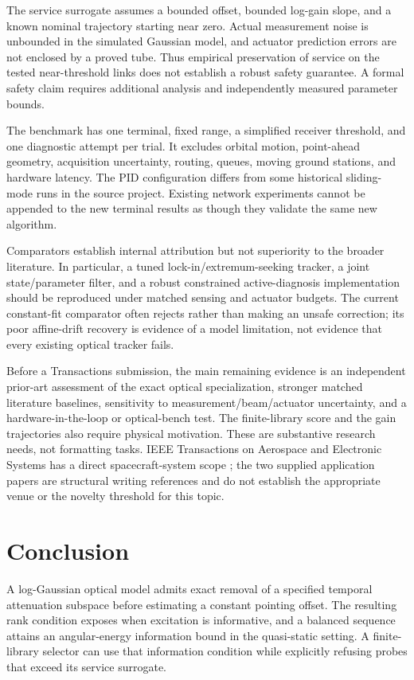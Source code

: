 \documentclass[journal]{IEEEtran}
\begin{document}
The service surrogate assumes a bounded offset, bounded log-gain slope, and a known nominal trajectory starting near zero. Actual measurement noise is unbounded in the simulated Gaussian model, and actuator prediction errors are not enclosed by a proved tube. Thus empirical preservation of service on the tested near-threshold links does not establish a robust safety guarantee. A formal safety claim requires additional analysis and independently measured parameter bounds.

The benchmark has one terminal, fixed range, a simplified receiver threshold, and one diagnostic attempt per trial. It excludes orbital motion, point-ahead geometry, acquisition uncertainty, routing, queues, moving ground stations, and hardware latency. The PID configuration differs from some historical sliding-mode runs in the source project. Existing network experiments cannot be appended to the new terminal results as though they validate the same new algorithm.

Comparators establish internal attribution but not superiority to the broader literature. In particular, a tuned lock-in/extremum-seeking tracker, a joint state/parameter filter, and a robust constrained active-diagnosis implementation should be reproduced under matched sensing and actuator budgets. The current constant-fit comparator often rejects rather than making an unsafe correction; its poor affine-drift recovery is evidence of a model limitation, not evidence that every existing optical tracker fails.

Before a Transactions submission, the main remaining evidence is an independent prior-art assessment of the exact optical specialization, stronger matched literature baselines, sensitivity to measurement/beam/actuator uncertainty, and a hardware-in-the-loop or optical-bench test. The finite-library score and the gain trajectories also require physical motivation. These are substantive research needs, not formatting tasks. IEEE Transactions on Aerospace and Electronic Systems has a direct spacecraft-system scope \cite{taesscope}; the two supplied application papers are structural writing references and do not establish the appropriate venue or the novelty threshold for this topic.

\balance
\section{Conclusion}
A log-Gaussian optical model admits exact removal of a specified temporal attenuation subspace before estimating a constant pointing offset. The resulting rank condition exposes when excitation is informative, and a balanced sequence attains an angular-energy information bound in the quasi-static setting. A finite-library selector can use that information condition while explicitly refusing probes that exceed its service surrogate.
\end{document}
